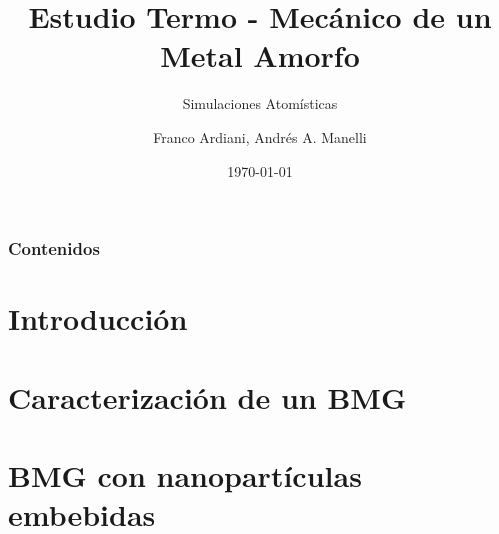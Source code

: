 \documentclass[12pt,t]{beamer}
\title[Estudio de un Metal Amorfo]{Estudio Termo - Mec\'anico de un Metal Amorfo}
\subtitle{Simulaciones Atom\'isticas}
\author[Ardiani, Manelli]{Franco Ardiani, Andr\'es A. Manelli}
\institute[UNCUYO]{Facultad de Ingenier\'ia, Universidad Nacional de Cuyo}
\date{\today}
\begin{document}

\maketitle

\begin{frame}
   \frametitle{Contenidos}
   \tableofcontents[currentsection,sectionstyle=show,subsectionstyle=show/shaded/hide]
\end{frame}


\section[Introducci\'on]{Introducci\'on}

\begin{frame}
 
\end{frame}


\section[Caracterizaci\'on]{Caracterizaci\'on de un BMG}

\begin{frame}
 
\end{frame}



\section[BMG con nanopart\'iculas]{BMG con nanopart\'iculas embebidas}
\end{document}
